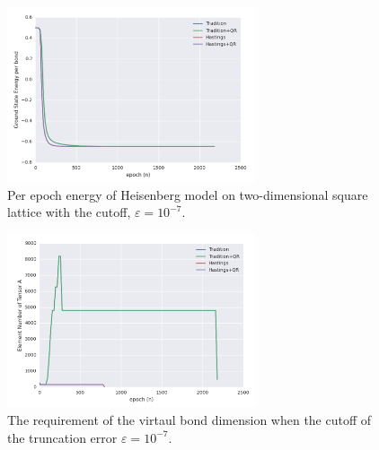 \begin{figure}[ht]
	\centering
	\includegraphics[width=0.65\textwidth]{figures/fig326.png}
	\caption[Per epoch energy of Heisenberg model on two-dimensional square lattice with the cutoff, $\varepsilon = 10^{-7}$]{Per epoch energy of Heisenberg model on two-dimensional square lattice with the cutoff, $\varepsilon = 10^{-7}$.}
	\label{fig326}
\end{figure}

\begin{figure}[ht]
	\centering
	\includegraphics[width=0.65\textwidth]{figures/fig327.png}
	\caption[The requirement of the virtaul bond dimension when the cutoff of the truncation error $\varepsilon = 10^{-7}$]{The requirement of the virtaul bond dimension when the cutoff of the truncation error $\varepsilon = 10^{-7}$.}
	\label{fig327}
\end{figure}
